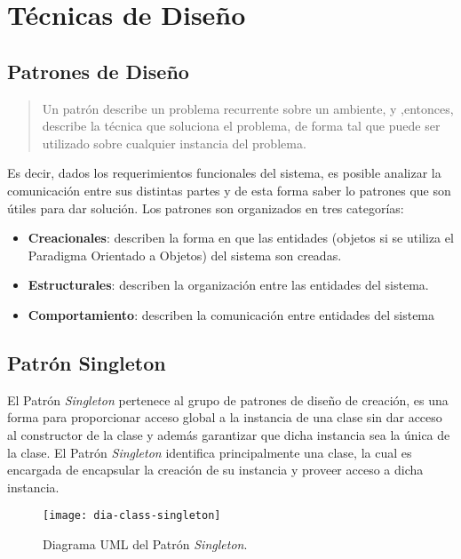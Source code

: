 \chapter{Técnicas de Diseño}\label{sec:patrones}

\section{Patrones de Diseño}
\begin{quote}
Un patrón describe un problema recurrente sobre un ambiente, y ,entonces, describe la técnica que soluciona el problema, de forma tal que puede ser utilizado sobre cualquier instancia del problema\cite{DesignPatterns}.
\end{quote}
Es decir, dados los requerimientos funcionales del sistema, es posible analizar la comunicación entre sus distintas partes y de esta forma saber lo patrones que son útiles para dar solución. Los patrones son organizados en tres categorías\cite{DesignPatterns}:
\begin{itemize}
	\item \textbf{Creacionales}: describen la forma en que las entidades (objetos si se utiliza el Paradigma Orientado a Objetos) del sistema son creadas.
	\item \textbf{Estructurales}: describen la organización entre las entidades del sistema.
	\item \textbf{Comportamiento}: describen la comunicación entre entidades del sistema
\end{itemize}

\section{Patrón Singleton}\label{sec:singleton}
El Patrón \textit{Singleton} pertenece al grupo de patrones de diseño de creación, es una forma para proporcionar acceso global a la instancia de una clase sin dar acceso al constructor de la clase y además garantizar que dicha instancia sea la única de la clase. El Patrón \textit{Singleton} identifica principalmente una clase, la cual es encargada de encapsular la creación de su instancia y proveer acceso a dicha instancia\cite{DesignPatternsLasater, DesignPatterns, OCPJavaSE7}.

\begin{figure}[h]
  \centering
  \texttt{[image: dia-class-singleton]}
  \caption{Diagrama UML del Patrón \textit{Singleton}\cite{DesignPatternsLasater}.}
  \label{fig:dia-class-singleton}
\end{figure}

